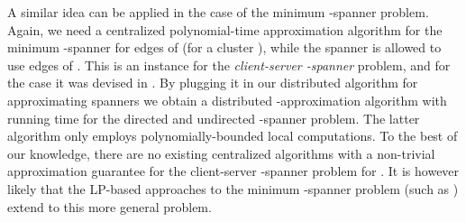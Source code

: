 \documentclass[11pt]{article}
\begin{document}
A similar idea can be applied in the case of the minimum -spanner problem. Again, we need a centralized polynomial-time approximation algorithm for the minimum -spanner for edges of  (for a cluster ), while the spanner is allowed to use edges of . This is an instance for the {\em client-server -spanner} problem, and for the case  it was devised in \cite{EP01}. By plugging it in our distributed algorithm for approximating spanners we obtain a distributed -approximation algorithm with running time  for the directed and undirected -spanner problem. The latter algorithm only employs polynomially-bounded local computations. To the best of our knowledge, there are no existing centralized algorithms with a non-trivial approximation guarantee for the client-server -spanner problem for . It is however likely that the LP-based approaches to the minimum -spanner problem (such as \cite{BBMRY11,DK11}) extend to this more general problem.
 
\end{document}
